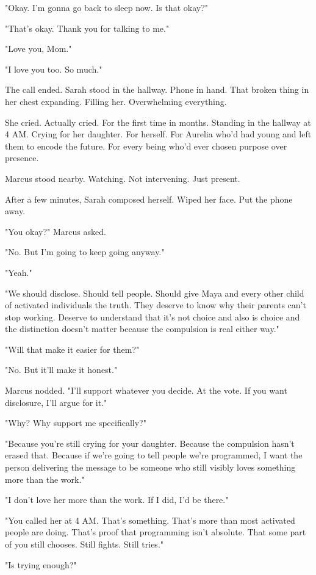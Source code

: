 "Okay. I'm gonna go back to sleep now. Is that okay?"

"That's okay. Thank you for talking to me."

"Love you, Mom."

"I love you too. So much."

The call ended. Sarah stood in the hallway. Phone in hand. That broken thing in her chest expanding. Filling her. Overwhelming everything.

She cried. Actually cried. For the first time in months. Standing in the hallway at 4 AM. Crying for her daughter. For herself. For Aurelia who'd had young and left them to encode the future. For every being who'd ever chosen purpose over presence.

Marcus stood nearby. Watching. Not intervening. Just present.

After a few minutes, Sarah composed herself. Wiped her face. Put the phone away.

"You okay?" Marcus asked.

"No. But I'm going to keep going anyway."

"Yeah."

"We should disclose. Should tell people. Should give Maya and every other child of activated individuals the truth. They deserve to know why their parents can't stop working. Deserve to understand that it's not choice and also is choice and the distinction doesn't matter because the compulsion is real either way."

"Will that make it easier for them?"

"No. But it'll make it honest."

Marcus nodded. "I'll support whatever you decide. At the vote. If you want disclosure, I'll argue for it."

"Why? Why support me specifically?"

"Because you're still crying for your daughter. Because the compulsion hasn't erased that. Because if we're going to tell people we're programmed, I want the person delivering the message to be someone who still visibly loves something more than the work."

"I don't love her more than the work. If I did, I'd be there."

"You called her at 4 AM. That's something. That's more than most activated people are doing. That's proof that programming isn't absolute. That some part of you still chooses. Still fights. Still tries."

"Is trying enough?"

